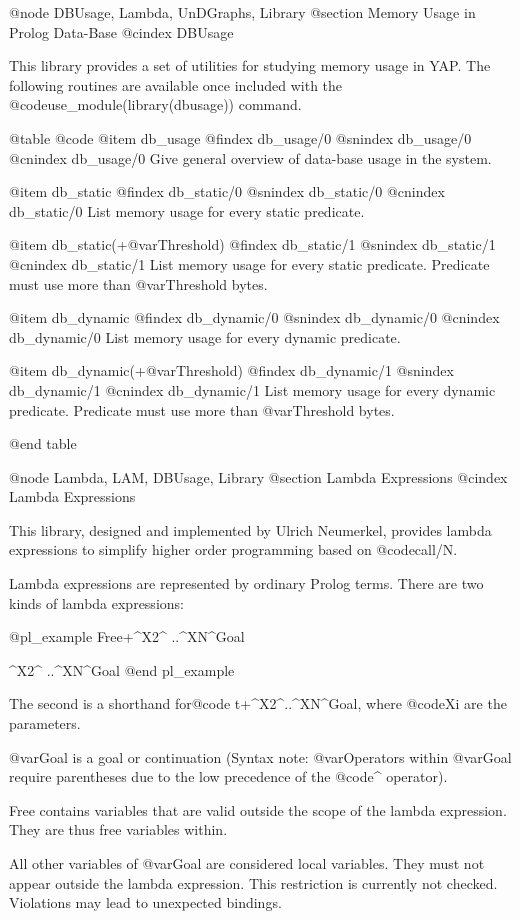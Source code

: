 @node DBUsage, Lambda, UnDGraphs, Library
@section Memory Usage in Prolog Data-Base
@cindex DBUsage

This library provides a set of utilities for studying memory usage in YAP.
The following routines are available once included with the
@code{use_module(library(dbusage))} command.

@table @code
@item db_usage
@findex db_usage/0
@snindex db_usage/0
@cnindex db_usage/0
Give general overview of data-base usage in the system.

@item db_static
@findex db_static/0
@snindex db_static/0
@cnindex db_static/0
List memory usage for every static predicate.

@item db_static(+@var{Threshold})
@findex db_static/1
@snindex db_static/1
@cnindex db_static/1
List memory usage for every static predicate. Predicate must use more
than @var{Threshold} bytes.

@item db_dynamic
@findex db_dynamic/0
@snindex db_dynamic/0
@cnindex db_dynamic/0
List memory usage for every dynamic predicate.

@item db_dynamic(+@var{Threshold})
@findex db_dynamic/1
@snindex db_dynamic/1
@cnindex db_dynamic/1
List memory usage for every dynamic predicate. Predicate must use more
than @var{Threshold} bytes.

@end table

@node Lambda, LAM, DBUsage, Library
@section Lambda Expressions
@cindex Lambda Expressions


This library, designed and implemented by Ulrich Neumerkel, provides
lambda expressions to simplify higher order programming based on @code{call/N}.

Lambda expressions are represented by ordinary Prolog terms.  There are
two kinds of lambda expressions:

@pl_example
    Free+^X2^ ..^XN^Goal

         ^X2^ ..^XN^Goal
@end pl_example

The second is a shorthand for@code{ t+^X2^..^XN^Goal}, where @code{Xi} are the parameters.

@var{Goal} is a goal or continuation (Syntax note: @var{Operators} within @var{Goal}
require parentheses due to the low precedence of the @code{^} operator).

Free contains variables that are valid outside the scope of the lambda
expression. They are thus free variables within.

All other variables of @var{Goal} are considered local variables. They must
not appear outside the lambda expression. This restriction is
currently not checked. Violations may lead to unexpected bindings.

